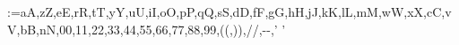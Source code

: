 \def\LD@String@If@Katakana#1#2#3{%
	\EA\LD@Counter@Temp@A\EA=\EA`#1\relax
	\ifnum\LD@Counter@Temp@A<12535\relax
		\ifnum\LD@Counter@Temp@A>12448\relax
			#2%
		\else
			#3%
		\fi
	\else
		#3%
	\fi
}%


\def\@LowerUpperDef#1#2{%
\expandafter\xdef\csname @Lower#1\endcsname{#1}%
\expandafter\xdef\csname @Lower#2\endcsname{#1}%
\expandafter\xdef\csname @Lupper#1\endcsname{#2}%
\expandafter\xdef\csname @Lupper#2\endcsname{#2}%
}%

\for\T@Letter:=aA,zZ,eE,rR,tT,yY,uU,iI,oO,pP,qQ,sS,dD,fF,gG,hH,jJ,kK,lL,mM,wW,xX,cC,vV,bB,nN,00,11,22,33,44,55,66,77,88,99,((,)),//,{-}{-},' '\do{%
\expandafter\@LowerUpperDef\T@Letter}

\newif\ifL@@p
\def\LD@LowerCase#1{\xdef\T@il{#1\relax}\xdef#1{}\L@@ptrue\loop\LD@String@Split\T@il{}\He@d\T@il\xdef#1{#1\csname @Lower\He@d\endcsname}\if\relax\T@il\L@@pfalse\fi\ifL@@p\repeat}
\def\LD@UpperCase#1{\xdef\T@il{#1\relax}\xdef#1{}\L@@ptrue\loop\Split\T@il{}\He@d\T@il\xdef#1{#1\csname @Lupper\He@d\endcsname}\if\relax\T@il\L@@pfalse\fi\ifL@@p\repeat}

\def\LD@Edef@Two#1#2#3#4{%
			\edef#3{#1}%
			\edef#4{#2}%
}%




\def\LD@Split#1#2#3#4{%
	\ifx#1\LD@Empty
		\def#3{}%
		\def#4{}%
	\else
		\def\LD@Split@Cut A##1#2##2\LD@Split@CutEnd{%
			\def#3{##1}%
			\def#4{##2}%
		}%
		\EA\LD@Split@Cut\EA A#1\LD@Split@CutEnd
	\fi
}%

\def\LD@Concat#1#2#3{%
	\LD@ToksOne=\expandafter{#1}%
	\LD@ToksTwo=\expandafter{#2}%
	\edef#3{\the\LD@ToksOne\the\LD@ToksTwo}%
}%
\def\LD@XConcat#1#2#3{%
	\LD@ToksOne=\expandafter{#1}%
	\LD@ToksTwo=\expandafter{#2}%
	\xdef#3{\the\LD@ToksOne\the\LD@ToksTwo}%
}%

